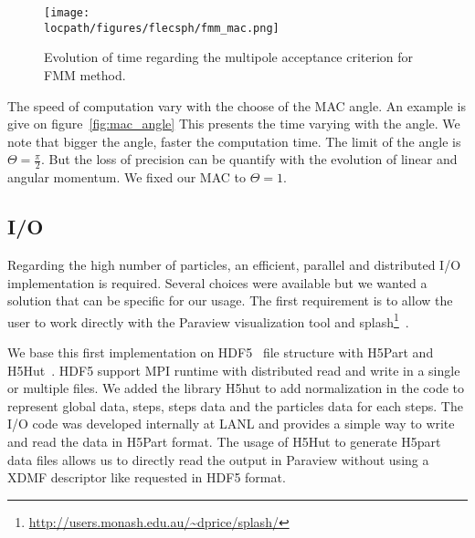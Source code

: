\begin{figure}[t!]
\centering
\texttt{[image: \\locpath/figures/flecsph/fmm\_mac.png]}
\caption{Evolution of time regarding the multipole acceptance criterion for FMM method.}
\end{figure}

The speed of computation vary with the choose of the MAC angle. 
An example is give on figure~\ref{fig:mac_angle}
This presents the time varying with the angle. 
We note that bigger the angle, faster the computation time. 
The limit of the angle is $\Theta =  \frac{\pi}{2}$.
But the loss of precision can be quantify with the evolution of linear and angular momentum.
We fixed our MAC to $\Theta = 1$.

\subsection{I/O}
Regarding the high number of particles, an efficient, parallel and distributed I/O implementation is required. 
Several choices were available but we wanted a solution that can be specific for our usage. 
The first requirement is to allow the user to work directly with the Paraview visualization tool and splash\footnote{\url{http://users.monash.edu.au/~dprice/splash/}}~\cite{price2007splash}.

We base this first implementation on HDF5~\cite{folk1999hdf5} file structure with H5Part and H5Hut~\cite{howison2010h5hut}. 
HDF5 support MPI runtime with distributed read and write in a single or multiple files. 
We added the library H5hut to add normalization in the code to represent global data, steps, steps data and the particles data for each steps.
The I/O code was developed internally at LANL and provides a simple way to write and read the data in H5Part format. 
The usage of H5Hut to generate H5part data files allows us to directly read the output in Paraview without using a XDMF descriptor like requested in HDF5 format.



